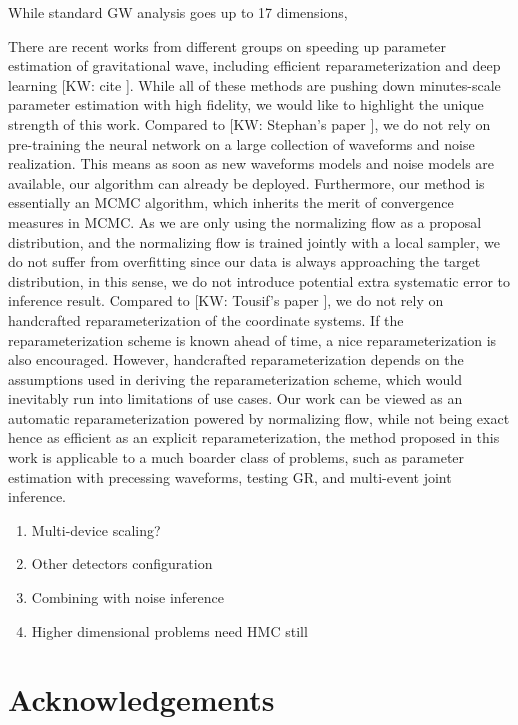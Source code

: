\documentclass[twocolumn]{aastex631}
\newcommand{\kw}[1]{{\color{rb4}[KW: #1 ]}}
\begin{document}
While standard GW analysis goes up to 17 dimensions, 


There are recent works from different groups on speeding up parameter estimation
of gravitational wave, including efficient reparameterization and deep learning
\kw{cite}. While all of these methods are pushing down minutes-scale parameter
estimation with high fidelity, we would like to highlight the unique strength of
this work. Compared to \kw{Stephan's paper}, we do not rely on pre-training the
neural network on a large collection of waveforms and noise realization. This
means as soon as new waveforms models and noise models are available, our
algorithm can already be deployed. Furthermore, our method is essentially an
MCMC algorithm, which inherits the merit of convergence measures in MCMC. As we
are only using the normalizing flow as a proposal distribution, and the
normalizing flow is trained jointly with a local sampler, we do not suffer from
overfitting since our data is always approaching the target distribution, in
this sense, we do not introduce potential extra systematic error to inference
result. Compared to \kw{Tousif's paper}, we do not rely on handcrafted
reparameterization of the coordinate systems. If the reparameterization scheme
is known ahead of time, a nice reparameterization is also encouraged. However,
handcrafted reparameterization depends on the assumptions used in deriving the
reparameterization scheme, which would inevitably run into limitations of use
cases. Our work can be viewed as an automatic reparameterization powered by
normalizing flow, while not being exact hence as efficient as an explicit
reparameterization, the method proposed in this work is applicable to a much
boarder class of problems, such as parameter estimation with precessing
waveforms, testing GR, and multi-event joint inference.



\begin{enumerate}
    \item Multi-device scaling?
    \item Other detectors configuration
    \item  Combining with noise inference
    \item Higher dimensional problems need HMC still
\end{enumerate}



\section{Acknowledgements}


\end{document}
